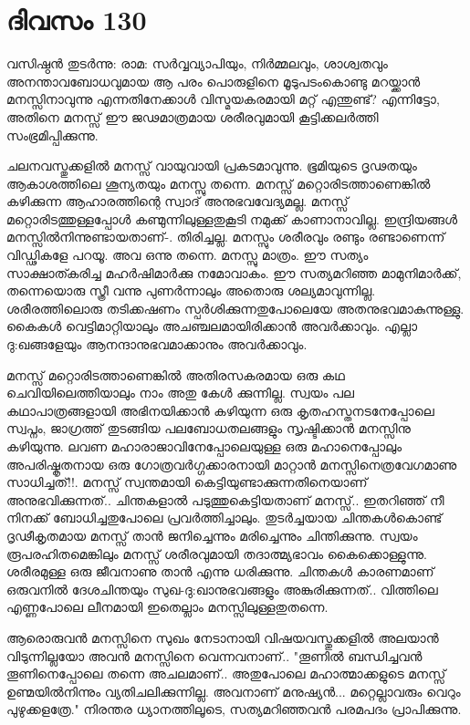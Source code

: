 \newpage
\section{ദിവസം 130}


വസിഷ്ഠന്‍ തുടര്‍ന്നു: രാമ: സര്‍വ്വവ്യാപിയും, നിര്‍മ്മലവും, ശാശ്വതവും അനന്താവബോധവുമായ ആ പരം പൊരുളിനെ മൂടുപടംകൊണ്ടു മറയ്ക്കാന്‍ മനസ്സിനാവുന്നു എന്നതിനേക്കാള്‍ വിസ്മയകരമായി മറ്റ്‌ എന്തുണ്ട്‌? എന്നിട്ടോ, അതിനെ മനസ്സ്‌ ഈ ജഢമാത്രമായ ശരീരവുമായി കൂട്ടിക്കലര്‍ത്തി സംഭ്രമിപ്പിക്കുന്നു.

ചലനവസ്തുക്കളില്‍ മനസ്സ്‌ വായുവായി പ്രകടമാവുന്നു. ഭൂമിയുടെ ദൃഢതയും ആകാശത്തിലെ ശൂന്യതയും മനസ്സു തന്നെ. മനസ്സ്‌ മറ്റൊരിടത്താണെങ്കില്‍ കഴിക്കുന്ന ആഹാരത്തിന്റെ സ്വാദ്‌ അനുഭവവേദ്യമല്ല. മനസ്സ്‌ മറ്റൊരിടത്തുള്ളപ്പോള്‍ കണ്മുന്നിലുള്ളതുകൂടി നമുക്ക്‌ കാണാനാവില്ല. ഇന്ദ്രിയങ്ങള്‍ മനസ്സില്‍നിന്നുണ്ടായതാണ്‌-. തിരിച്ചല്ല. മനസ്സും ശരീരവും രണ്ടും രണ്ടാണെന്ന് വിഡ്ഢികളേ പറയൂ. അവ ഒന്നു തന്നെ. മനസ്സു മാത്രം. ഈ സത്യം സാക്ഷാത്കരിച്ച മഹര്‍ഷിമാര്‍ക്കു നമോവാകം. ഈ സത്യമറിഞ്ഞ മാമുനിമാര്‍ക്ക്‌, തന്നെയൊരു സ്ത്രീ വന്നു പുണര്‍ന്നാലും അതൊരു ശല്യമാവുന്നില്ല. ശരീരത്തിലൊരു തടിക്കഷണം സ്പര്‍ശിക്കുന്നതുപോലെയേ അതനുഭവമാകുന്നുള്ളു. കൈകള്‍ വെട്ടിമാറ്റിയാലും അചഞ്ചലമായിരിക്കാന്‍ അവര്‍ക്കാവും. എല്ലാ ദു:ഖങ്ങളേയും ആനന്ദാനുഭവമാക്കാനും അവര്‍ക്കാവും.

മനസ്സ്‌ മറ്റൊരിടത്താണെങ്കില്‍ അതിരസകരമായ ഒരു കഥ ചെവിയിലെത്തിയാലും നാം അതു കേള്‍ ക്കുന്നില്ല. സ്വയം പല കഥാപാത്രങ്ങളായി അഭിനയിക്കാന്‍ കഴിയുന്ന ഒരു കൃതഹസ്തനടനേപ്പോലെ സ്വപ്നം, ജാഗ്രത്ത്‌ തുടങ്ങിയ പലബോധതലങ്ങളും സൃഷ്ടിക്കാന്‍ മനസ്സിനു കഴിയുന്നു. ലവണ മഹാരാജാവിനേപ്പോലെയുള്ള ഒരു മഹാനെപ്പോലും അപരിഷ്കൃതനായ ഒരു ഗോത്രവര്‍ഗ്ഗക്കാരനായി മാറ്റാന്‍ മനസ്സിനെത്രവേഗമാണു സാധിച്ചത്‌!!. മനസ്സ്‌ സ്വന്തമായി കെട്ടിയുണ്ടാക്കുന്നതിനെയാണ്‌ അനുഭവിക്കുന്നത്‌.. ചിന്തകളാല്‍ പടുത്തുകെട്ടിയതാണ്‌ മനസ്സ്‌.. ഇതറിഞ്ഞ്‌ നീ നിനക്ക്‌ ബോധിച്ചതുപോലെ പ്രവര്‍ത്തിച്ചാലും. തുടര്‍ച്ചയായ ചിന്തകള്‍കൊണ്ട്‌ ദൃഢീകൃതമായ മനസ്സ്‌ താന്‍ ജനിച്ചെന്നും മരിച്ചെന്നും ചിന്തിക്കുന്നു. സ്വയം രൂപരഹിതമെങ്കിലും മനസ്സ്‌ ശരീരവുമായി തദാത്മ്യഭാവം കൈക്കൊള്ളുന്നു. ശരീരമുള്ള ഒരു ജീവനാണു താന്‍ എന്നു ധരിക്കുന്നു. ചിന്തകള്‍ കാരണമാണ്‌ ഒരുവനില്‍ ദേശചിന്തയും സുഖ-ദു:ഖാനുഭവങ്ങളും അങ്കുരിക്കുന്നത്‌.. വിത്തിലെ എണ്ണപോലെ ലീനമായി ഇതെല്ലാം മനസ്സിലുള്ളതുതന്നെ.

ആരൊരുവന്‍ മനസ്സിനെ സുഖം നേടാനായി വിഷയവസ്തുക്കളില്‍ അലയാന്‍ വിടുന്നില്ലയോ അവന്‍ മനസ്സിനെ വെന്നവനാണ്‌.. "തൂണില്‍ ബന്ധിച്ചവന്‍ തൂണിനെപ്പോലെ തന്നെ അചലമാണ്‌.. അതുപോലെ മഹാത്മാക്കളുടെ മനസ്സ്‌ ഉണ്മയില്‍നിന്നും വ്യതിചലിക്കുന്നില്ല. അവനാണ്‌ മനുഷ്യന്‍... മറ്റെല്ലാവരും വെറും പുഴുക്കളത്രേ." നിരന്തര ധ്യാനത്തിലൂടെ, സത്യമറിഞ്ഞവന്‍ പരമപദം പ്രാപിക്കുന്നു. 

